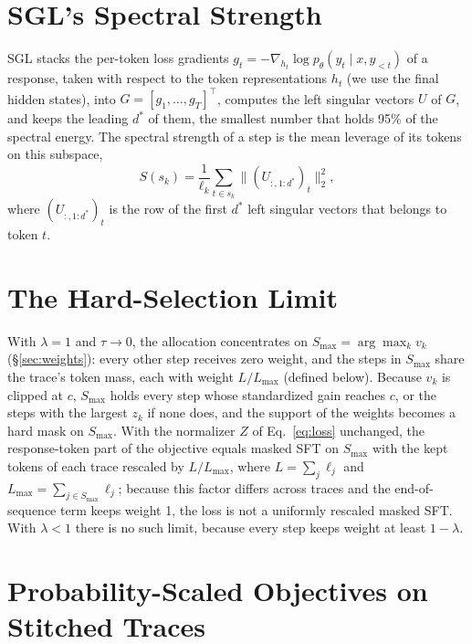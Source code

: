 \documentclass[11pt]{article}
\begin{document}
\section{SGL's Spectral Strength}
\label{app:sgl}

SGL \citep{fan2026sgl} stacks the per-token loss gradients $g_t=-\nabla_{h_t}\log p_\theta(y_t\mid x,y_{<t})$ of a response, taken with respect to the token representations $h_t$ (we use the final hidden states), into $G=[g_1,\dots,g_T]^\top$, computes the left singular vectors $U$ of $G$, and keeps the leading $d^*$ of them, the smallest number that holds 95\% of the spectral energy.
The spectral strength of a step is the mean leverage of its tokens on this subspace,
\begin{equation}
  S(s_k)=\frac{1}{\ell_k}\sum_{t\in s_k}\big\|(U_{:,1:d^*})_t\big\|_2^2 ,
\end{equation}
where $(U_{:,1:d^*})_t$ is the row of the first $d^*$ left singular vectors that belongs to token $t$.

\section{The Hard-Selection Limit}
\label{app:limit}

With $\lambda=1$ and $\tau\to0$, the allocation concentrates on $S_{\max}=\arg\max_k v_k$ (\S\ref{sec:weights}): every other step receives zero weight, and the steps in $S_{\max}$ share the trace's token mass, each with weight $L/L_{\max}$ (defined below).
Because $v_k$ is clipped at $c$, $S_{\max}$ holds every step whose standardized gain reaches $c$, or the steps with the largest $z_k$ if none does, and the support of the weights becomes a hard mask on $S_{\max}$.
With the normalizer $Z$ of Eq.~\ref{eq:loss} unchanged, the response-token part of the objective equals masked SFT on $S_{\max}$ with the kept tokens of each trace rescaled by $L/L_{\max}$, where $L=\sum_j\ell_j$ and $L_{\max}=\sum_{j\in S_{\max}}\ell_j$; because this factor differs across traces and the end-of-sequence term keeps weight 1, the loss is not a uniformly rescaled masked SFT.
With $\lambda<1$ there is no such limit, because every step keeps weight at least $1-\lambda$.


\section{Probability-Scaled Objectives on Stitched Traces}
\label{app:dft}
\end{document}
